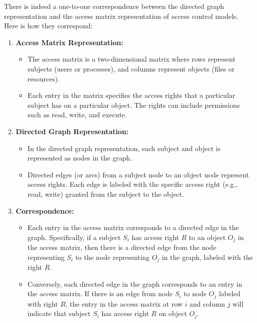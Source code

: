 \documentclass{article}
\begin{document}
                            There is indeed a one-to-one correspondence between the directed graph representation and the access matrix representation of access control models. Here is how they correspond:

                \begin{enumerate}
                    \item \textbf{Access Matrix Representation:}
                    \begin{itemize}
                        \item The access matrix is a two-dimensional matrix where rows represent subjects (users or processes), and columns represent objects (files or resources).
                        \item Each entry in the matrix specifies the access rights that a particular subject has on a particular object. The rights can include permissions such as read, write, and execute.
                    \end{itemize}
                    
                    \item \textbf{Directed Graph Representation:}
                    \begin{itemize}
                        \item In the directed graph representation, each subject and object is represented as nodes in the graph.
                        \item Directed edges (or arcs) from a subject node to an object node represent access rights. Each edge is labeled with the specific access right (e.g., read, write) granted from the subject to the object.
                    \end{itemize}
                    
                    \item \textbf{Correspondence:}
                    \begin{itemize}
                        \item Each entry in the access matrix corresponds to a directed edge in the graph. Specifically, if a subject $S_i$ has access right $R$ to an object $O_j$ in the access matrix, then there is a directed edge from the node representing $S_i$ to the node representing $O_j$ in the graph, labeled with the right $R$.
                        \item Conversely, each directed edge in the graph corresponds to an entry in the access matrix. If there is an edge from node $S_i$ to node $O_j$ labeled with right $R$, the entry in the access matrix at row $i$ and column $j$ will indicate that subject $S_i$ has access right $R$ on object $O_j$.
                    \end{itemize}
                \end{enumerate}
\end{document}
